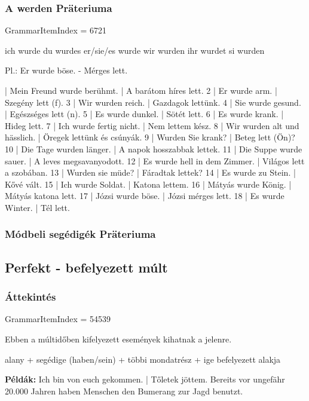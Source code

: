 \documentclass{article}
\newenvironment{desc}{\verbatim}{\endverbatim}
\newenvironment{exmp}{\verbatim}{\endverbatim}
\begin{document}
\subsubsection{A werden Präteriuma}

GrammarItemIndex = 6721

\begin{desc}
ich wurde
du wurdes
er/sie/es wurde
wir wurden
ihr wurdet
si wurden

Pl.: Er wurde böse. - Mérges lett.
\end{desc}

\begin{exmp}
1 | Mein Freund wurde berühmt. | A barátom híres lett.
2 | Er wurde arm. | Szegény lett (f).
3 | Wir wurden reich. | Gazdagok lettünk.
4 | Sie wurde gesund. | Egészséges lett (n).
5 | Es wurde dunkel. | Sötét lett.
6 | Es wurde krank. | Hideg lett.
7 | Ich wurde fertig nicht. | Nem lettem kész.
8 | Wir wurden alt und hässlich. | Öregek lettünk és csúnyák.
9 | Wurden Sie krank? | Beteg lett (Ön)?
10 | Die Tage wurden länger. | A napok hosszabbak lettek.
11 | Die Suppe wurde sauer. | A leves megsavanyodott.
12 | Es wurde hell in dem Zimmer. | Világos lett a szobában.
13 | Wurden sie müde? | Fáradtak lettek?
14 | Es wurde zu Stein. | Kővé vált.
15 | Ich wurde Soldat. | Katona lettem.
16 | Mátyás wurde König. | Mátyás katona lett.
17 | Józsi wurde böse. | Józsi mérges lett.
18 | Es wurde Winter. | Tél lett.
\end{exmp}

\subsubsection{Módbeli segédigék Präteriuma}

\subsection{Perfekt - befelyezett múlt}

\subsubsection{Áttekintés}

GrammarItemIndex = 54539

\begin{desc}
Ebben a múltidőben kifelyezett események kihatnak a jelenre.
\begin{center}
alany + segédige (haben/sein) + többi mondatrész + ige befelyezett alakja
\end{center}

\textbf{Példák:} Ich bin von euch gekommen. | Tőletek jöttem.
Bereits vor ungefähr 20.000 Jahren haben Menschen den Bumerang zur Jagd benutzt.
\end{desc}
\end{document}
